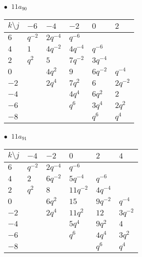 \begin{minipage}{\linewidth}
$\bullet\ $ $11a_{90}$ \vspace{0.5em} \\
\begin{tabular}{l|lllll}
$k \setminus j$ & $-6$ & $-4$ & $-2$ & $0$ & $2$ \\
\hline
$6$ & $q^{-2}$ & $2q^{-4}$ & $q^{-6}$ &  &  \\
$4$ & $1$ & $4q^{-2}$ & $4q^{-4}$ & $q^{-6}$ &  \\
$2$ & $q^{2}$ & $5$ & $7q^{-2}$ & $3q^{-4}$ &  \\
$0$ &  & $4q^{2}$ & $9$ & $6q^{-2}$ & $q^{-4}$ \\
$-2$ &  & $2q^{4}$ & $7q^{2}$ & $6$ & $2q^{-2}$ \\
$-4$ &  &  & $4q^{4}$ & $6q^{2}$ & $2$ \\
$-6$ &  &  & $q^{6}$ & $3q^{4}$ & $2q^{2}$ \\
$-8$ &  &  &  & $q^{6}$ & $q^{4}$ \\
\end{tabular}
\vspace{2em}
\end{minipage}
%
\begin{minipage}{\linewidth}
$\bullet\ $ $11a_{91}$ \vspace{0.5em} \\
\begin{tabular}{l|lllll}
$k \setminus j$ & $-4$ & $-2$ & $0$ & $2$ & $4$ \\
\hline
$6$ & $q^{-2}$ & $2q^{-4}$ & $q^{-6}$ &  &  \\
$4$ & $2$ & $6q^{-2}$ & $5q^{-4}$ & $q^{-6}$ &  \\
$2$ & $q^{2}$ & $8$ & $11q^{-2}$ & $4q^{-4}$ &  \\
$0$ &  & $6q^{2}$ & $15$ & $9q^{-2}$ & $q^{-4}$ \\
$-2$ &  & $2q^{4}$ & $11q^{2}$ & $12$ & $3q^{-2}$ \\
$-4$ &  &  & $5q^{4}$ & $9q^{2}$ & $4$ \\
$-6$ &  &  & $q^{6}$ & $4q^{4}$ & $3q^{2}$ \\
$-8$ &  &  &  & $q^{6}$ & $q^{4}$ \\
\end{tabular}
\vspace{2em}
\end{minipage}
%

